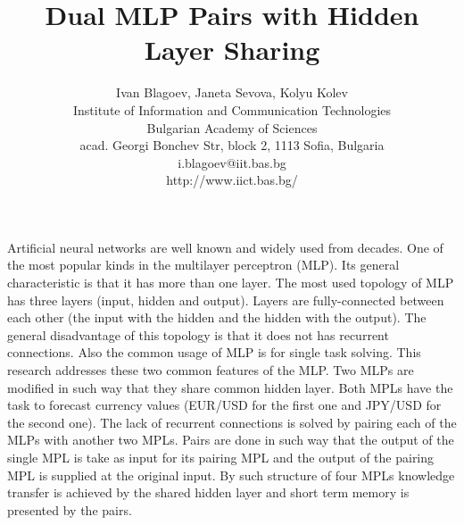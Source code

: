 \documentclass[12pt,a4paper]{article}
\title{\bf Dual MLP Pairs with Hidden Layer Sharing}
\author{Ivan Blagoev, Janeta Sevova, Kolyu Kolev \\
Institute of Information and Communication Technologies \\
Bulgarian Academy of Sciences \\
acad. Georgi Bonchev Str, block 2, 1113 Sofia, Bulgaria \\
i.blagoev@iit.bas.bg \\
http://www.iict.bas.bg/}
\date{}
\begin{document}
\maketitle

Artificial neural networks are well known and widely used from decades. One of the most popular kinds in the multilayer perceptron (MLP). Its general characteristic is that it has more than one layer. The most used topology of MLP has three layers (input, hidden and output). Layers are fully-connected between each other (the input with the hidden and the hidden with the output). The general disadvantage of this topology is that it does not has recurrent connections. Also the common usage of MLP is for single task solving. This research addresses these two common features of the MLP. Two MLPs are modified in such way that they share common hidden layer. Both MPLs have the task to forecast currency values (EUR/USD for the first one and JPY/USD for the second one). The lack of recurrent connections is solved by pairing each of the MLPs with another two MPLs. Pairs are done in such way that the output of the single MPL is take as input for its pairing MPL and the output of the pairing MPL is supplied at the original input. By such structure of four MPLs knowledge transfer is achieved by the shared hidden layer and short term memory is presented by the pairs. 
\end{document}
